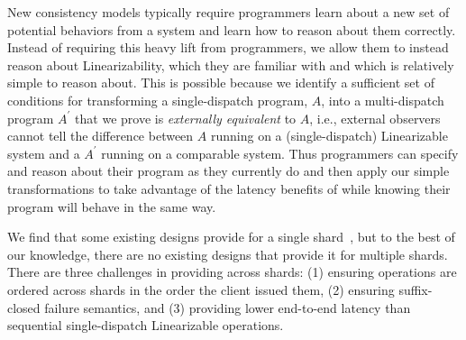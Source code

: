 
New consistency models typically require programmers learn about a new set of potential behaviors from a system and learn how to reason about them correctly.
Instead of requiring this heavy lift from programmers, we allow them to instead reason about Linearizability, which they are familiar with and which is relatively simple to reason about.
This is possible because we identify a sufficient set of conditions for transforming a single-dispatch program, $A$, into a multi-dispatch program $A^\prime$ that we prove is \textit{externally equivalent} to $A$, i.e., external observers cannot tell the difference between $A$ running on a (single-dispatch) Linearizable system and a $A^\prime$ running on a
comparable \mdl{} system.
Thus programmers can specify and reason about their program as they currently do and then apply our simple transformations to take advantage of the latency benefits of \mdl{} while knowing their program will behave in the same way.


We find that some existing designs provide \mdllong{} for a single shard~\cite{ongaro2014consensus}, but to the best of our knowledge, there are no existing designs that provide it for multiple shards.
There are three challenges in providing \mdl{} across shards:
(1) ensuring operations are ordered across shards in the order the client issued them,
(2) ensuring suffix-closed failure semantics,
and
(3) providing lower end-to-end latency than sequential single-dispatch Linearizable operations.

